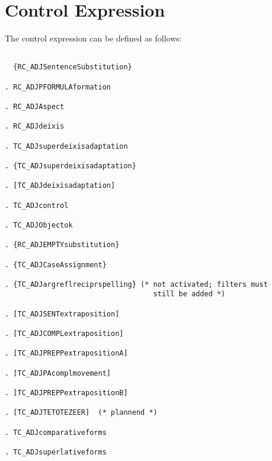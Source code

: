 \section{Control Expression}
The control expression can be defined as follows:
\begin{verbatim}

  {RC_ADJSentenceSubstitution}

. RC_ADJPFORMULAformation

. RC_ADJAspect

. RC_ADJdeixis

. TC_ADJsuperdeixisadaptation

. {TC_ADJsuperdeixisadaptation}

. [TC_ADJdeixisadaptation]

. TC_ADJcontrol

. TC_ADJObjectok

. {RC_ADJEMPTYsubstitution}

. {TC_ADJCaseAssignment}

. {TC_ADJargreflreciprspelling} (* not activated; filters must 
                                   still be added *) 

. [TC_ADJSENTextraposition]

. [TC_ADJCOMPLextraposition]

. [TC_ADJPREPPextrapositionA]

. [TC_ADJPAcomplmovement]

. [TC_ADJPREPPextrapositionB]

. [TC_ADJTETOTEZEER]  (* plannend *)

. TC_ADJcomparativeforms

. TC_ADJsuperlativeforms

\end{verbatim}

